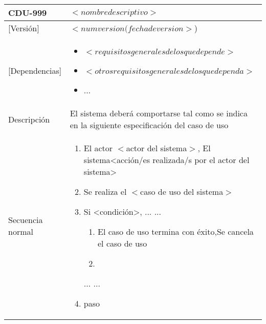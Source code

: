 \begin{Artefacto}[H]
    \centering
    \begin{tabular}{|p{3cm}|p{10cm}|}
        \hline
         \cellcolor{gray30}  CDU-999	&  $<nombre descriptivo>$\\ 
        \hline
         \cellcolor{gray30}  [Versión]	&  $<num version(fecha de version>$)\\   
         \hline
         \cellcolor{gray30}  [Dependencias] &  	\begin{itemize} 	\item $<requisitos generales de los que depende>$
\item $<otros requisitos generales de los que dependa>$
\item	... \end{itemize}\\  
        \hline
         \cellcolor{gray30} Descripción	&El sistema deberá comportarse tal como se indica en la siguiente especificación del caso de uso\\
\hline
          
         \cellcolor{gray30}  Secuencia normal&  	
         \begin{enumerate} 	
             \item	{El actor $<$actor del sistema$>$, El sistema}<acción/es realizada/s por el actor del sistema>
			\item	Se realiza el $<$caso de uso del sistema$>$
			\item	Si <condición>,
            ...	...
            \begin{enumerate}
		       \item El caso de uso termina con éxito,Se cancela el caso de uso
               \item
       
        	\end{enumerate}
	...	...\item paso 
													

\end{enumerate}
\end{tabular}
\end{Artefacto}
